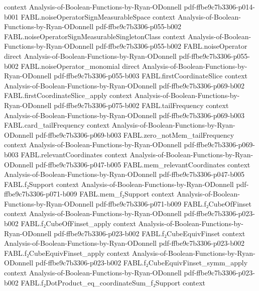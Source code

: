 \begin{theorem}
  {context}
  {Analysis-of-Boolean-Functions-by-Ryan-ODonnell}
  {pdf-ffbe9c7b3306-p014-b001}
\proofstep
  {FABL.noiseOperatorSignMeasurableSpace}
  {context}
  {Analysis-of-Boolean-Functions-by-Ryan-ODonnell}
  {pdf-ffbe9c7b3306-p055-b002}
\proofstep
  {FABL.noiseOperatorSignMeasurableSingletonClass}
  {context}
  {Analysis-of-Boolean-Functions-by-Ryan-ODonnell}
  {pdf-ffbe9c7b3306-p055-b002}
\proofstep
  {FABL.noiseOperator}
  {direct}
  {Analysis-of-Boolean-Functions-by-Ryan-ODonnell}
  {pdf-ffbe9c7b3306-p055-b002}
\proofstep
  {FABL.noiseOperator_monomial}
  {direct}
  {Analysis-of-Boolean-Functions-by-Ryan-ODonnell}
  {pdf-ffbe9c7b3306-p055-b003}
\proofstep
  {FABL.firstCoordinateSlice}
  {context}
  {Analysis-of-Boolean-Functions-by-Ryan-ODonnell}
  {pdf-ffbe9c7b3306-p069-b002}
\proofstep
  {FABL.firstCoordinateSlice_apply}
  {context}
  {Analysis-of-Boolean-Functions-by-Ryan-ODonnell}
  {pdf-ffbe9c7b3306-p075-b002}
\proofstep
  {FABL.tailFrequency}
  {context}
  {Analysis-of-Boolean-Functions-by-Ryan-ODonnell}
  {pdf-ffbe9c7b3306-p069-b003}
\proofstep
  {FABL.card_tailFrequency}
  {context}
  {Analysis-of-Boolean-Functions-by-Ryan-ODonnell}
  {pdf-ffbe9c7b3306-p069-b003}
\proofstep
  {FABL.zero_notMem_tailFrequency}
  {context}
  {Analysis-of-Boolean-Functions-by-Ryan-ODonnell}
  {pdf-ffbe9c7b3306-p069-b003}
\proofstep
  {FABL.relevantCoordinates}
  {context}
  {Analysis-of-Boolean-Functions-by-Ryan-ODonnell}
  {pdf-ffbe9c7b3306-p047-b005}
\proofstep
  {FABL.mem_relevantCoordinates}
  {context}
  {Analysis-of-Boolean-Functions-by-Ryan-ODonnell}
  {pdf-ffbe9c7b3306-p047-b005}
\proofstep
  {FABL.f₂Support}
  {context}
  {Analysis-of-Boolean-Functions-by-Ryan-ODonnell}
  {pdf-ffbe9c7b3306-p071-b009}
\proofstep
  {FABL.mem_f₂Support}
  {context}
  {Analysis-of-Boolean-Functions-by-Ryan-ODonnell}
  {pdf-ffbe9c7b3306-p071-b009}
\proofstep
  {FABL.f₂CubeOfFinset}
  {context}
  {Analysis-of-Boolean-Functions-by-Ryan-ODonnell}
  {pdf-ffbe9c7b3306-p023-b002}
\proofstep
  {FABL.f₂CubeOfFinset_apply}
  {context}
  {Analysis-of-Boolean-Functions-by-Ryan-ODonnell}
  {pdf-ffbe9c7b3306-p023-b002}
\proofstep
  {FABL.f₂CubeEquivFinset}
  {context}
  {Analysis-of-Boolean-Functions-by-Ryan-ODonnell}
  {pdf-ffbe9c7b3306-p023-b002}
\proofstep
  {FABL.f₂CubeEquivFinset_apply}
  {context}
  {Analysis-of-Boolean-Functions-by-Ryan-ODonnell}
  {pdf-ffbe9c7b3306-p023-b002}
\proofstep
  {FABL.f₂CubeEquivFinset_symm_apply}
  {context}
  {Analysis-of-Boolean-Functions-by-Ryan-ODonnell}
  {pdf-ffbe9c7b3306-p023-b002}
\proofstep
  {FABL.f₂DotProduct_eq_coordinateSum_f₂Support}
  {context}

\end{theorem}
